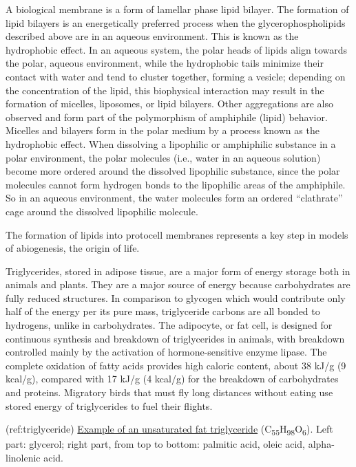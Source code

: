 A biological membrane is a form of lamellar phase lipid bilayer. The
formation of lipid bilayers is an energetically preferred process when
the glycerophospholipids described above are in an aqueous environment.
This is known as the hydrophobic effect. In an aqueous system, the polar
heads of lipids align towards the polar, aqueous environment, while the
hydrophobic tails minimize their contact with water and tend to cluster
together, forming a vesicle; depending on the concentration of the
lipid, this biophysical interaction may result in the formation of
micelles, liposomes, or lipid bilayers. Other aggregations are also
observed and form part of the polymorphism of amphiphile (lipid)
behavior. Micelles and bilayers form in the polar medium by a process
known as the hydrophobic effect. When dissolving a lipophilic or
amphiphilic substance in a polar environment, the polar molecules (i.e.,
water in an aqueous solution) become more ordered around the dissolved
lipophilic substance, since the polar molecules cannot form hydrogen
bonds to the lipophilic areas of the amphiphile. So in an aqueous
environment, the water molecules form an ordered ``clathrate'' cage
around the dissolved lipophilic molecule.

The formation of lipids into protocell membranes represents a key step
in models of abiogenesis, the origin of life.

Triglycerides, stored in adipose tissue, are a major form of energy
storage both in animals and plants. They are a major source of energy
because carbohydrates are fully reduced structures. In comparison to
glycogen which would contribute only half of the energy per its pure
mass, triglyceride carbons are all bonded to hydrogens, unlike in
carbohydrates. The adipocyte, or fat cell, is designed for continuous
synthesis and breakdown of triglycerides in animals, with breakdown
controlled mainly by the activation of hormone-sensitive enzyme lipase.
The complete oxidation of fatty acids provides high caloric content,
about 38 kJ/g (9 kcal/g), compared with 17 kJ/g (4 kcal/g) for the
breakdown of carbohydrates and proteins. Migratory birds that must fly
long distances without eating use stored energy of triglycerides to fuel
their flights.

(ref:triglyceride)
\href{https://commons.wikimedia.org/wiki/File:Fat_triglyceride_shorthand_formula.PNG}{Example
of an unsaturated fat triglyceride}
(C\textsubscript{55}H\textsubscript{98}O\textsubscript{6}). Left part:
glycerol; right part, from top to bottom: palmitic acid, oleic acid,
alpha-linolenic acid.

